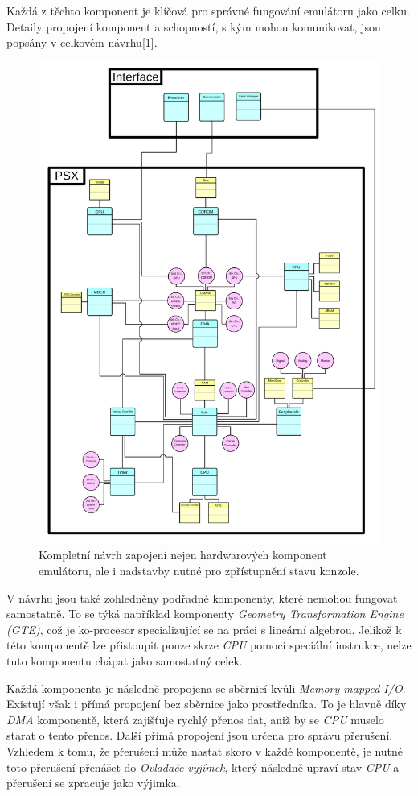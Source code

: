 Každá z těchto komponent je klíčová pro správné fungování emulátoru jako celku.
Detaily propojení komponent a schopností, s kým mohou komunikovat, jsou popsány v celkovém návrhu[\ref{psx-layout}].

\begin{figure}[hbt]
\centering
\includegraphics[width=1.0\textwidth]{obrazky-figures/psx-layout.png}
\caption{Kompletní návrh zapojení nejen hardwarových komponent emulátoru, ale i nadstavby nutné pro zpřístupnění stavu konzole.}
\label{psx-layout}
\end{figure}

V návrhu jsou také zohledněny podřadné komponenty, které nemohou fungovat samostatně.
To se týká například komponenty \textit{Geometry Transformation Engine (GTE)}, což je
ko-procesor specializující se na práci s lineární algebrou. Jelikož k této komponentě lze přistoupit
pouze skrze \textit{CPU} pomocí speciální instrukce, nelze tuto komponentu chápat jako samostatný celek.

Každá komponenta je následně propojena se sběrnicí kvůli \textit{Memory-mapped I/O}. Existují
však i přímá propojení bez sběrnice jako prostředníka. To je hlavně díky \textit{DMA} komponentě,
která zajišťuje rychlý přenos dat, aniž by se \textit{CPU} muselo starat o tento přenos. Další
přímá propojení jsou určena pro správu přerušení. Vzhledem k tomu, že přerušení může nastat skoro v
každé komponentě, je nutné toto přerušení přenášet do \textit{Ovladače vyjímek}, který následně
upraví stav \textit{CPU} a přerušení se zpracuje jako výjimka.